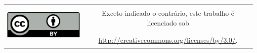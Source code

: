 \documentclass[]{beamer}
\begin{document}
\begin{frame}[t,fragile]
  \vfill
  \begin{center}
    \begin{tabular}[]{cc}
      \multirow{2}{*}{\includegraphics[height=60pt]{figures/cc-by}} &
      \Large{Exceto indicado o contrário, este trabalho é licenciado sob}\\
      & \Large{\url{http://creativecommons.org/licenses/by/3.0/}.}
    \end{tabular}
  \end{center}
\end{frame}
\end{document}
